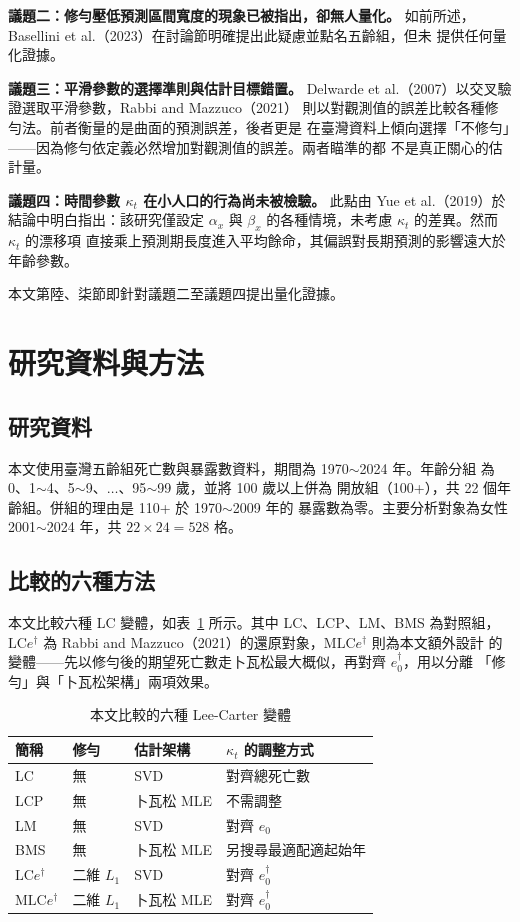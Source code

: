 \documentclass[UTF8, fontset=macnew, a4paper, 12pt]{ctexart}
\newcommand{\edag}{e_0^{\dagger}}
\newcommand{\LCe}{\mathrm{LC}e^{\dagger}}
\begin{document}
\textbf{議題二：修勻壓低預測區間寬度的現象已被指出，卻無人量化。}
如前所述，Basellini et al.（2023）在討論節明確提出此疑慮並點名五齡組，但未
提供任何量化證據。

\textbf{議題三：平滑參數的選擇準則與估計目標錯置。}
Delwarde et al.（2007）以交叉驗證選取平滑參數，Rabbi and Mazzuco（2021）
則以對觀測值的誤差比較各種修勻法。前者衡量的是曲面的預測誤差，後者更是
在臺灣資料上傾向選擇「不修勻」——因為修勻依定義必然增加對觀測值的誤差。兩者瞄準的都
不是真正關心的估計量。

\textbf{議題四：時間參數 $\kappa_t$ 在小人口的行為尚未被檢驗。}
此點由 Yue et al.（2019）於結論中明白指出：該研究僅設定 $\alpha_x$ 與
$\beta_x$ 的各種情境，未考慮 $\kappa_t$ 的差異。然而 $\kappa_t$ 的漂移項
直接乘上預測期長度進入平均餘命，其偏誤對長期預測的影響遠大於年齡參數。

本文第陸、柒節即針對議題二至議題四提出量化證據。

\section{研究資料與方法}

\subsection{研究資料}

本文使用臺灣五齡組死亡數與暴露數資料，期間為 1970$\sim$2024 年。年齡分組
為 0、1$\sim$4、5$\sim$9、$\ldots$、95$\sim$99 歲，並將 100 歲以上併為
開放組（100+），共 22 個年齡組。併組的理由是 110+ 於 1970$\sim$2009 年的
暴露數為零。主要分析對象為女性 2001$\sim$2024 年，共 $22\times24=528$ 格。

\subsection{比較的六種方法}

本文比較六種 LC 變體，如表~\ref{tab:variants} 所示。其中 LC、LCP、LM、BMS 為對照組，
$\LCe$ 為 Rabbi and Mazzuco（2021）的還原對象，M$\LCe$ 則為本文額外設計
的變體——先以修勻後的期望死亡數走卜瓦松最大概似，再對齊 $\edag$，用以分離
「修勻」與「卜瓦松架構」兩項效果。

\begin{table}[H]
\centering
\caption{本文比較的六種 Lee-Carter 變體}
\small
\begin{tabular}{llll}
\toprule
簡稱 & 修勻 & 估計架構 & $\kappa_t$ 的調整方式\\
\midrule
LC      & 無 & SVD & 對齊總死亡數\\
LCP     & 無 & 卜瓦松 MLE & 不需調整\\
LM      & 無 & SVD & 對齊 $e_0$\\
BMS     & 無 & 卜瓦松 MLE & 另搜尋最適配適起始年\\
$\LCe$  & 二維 $L_1$ & SVD & 對齊 $\edag$\\
M$\LCe$ & 二維 $L_1$ & 卜瓦松 MLE & 對齊 $\edag$\\
\bottomrule
\end{tabular}
\label{tab:variants}
\end{table}
\end{document}
